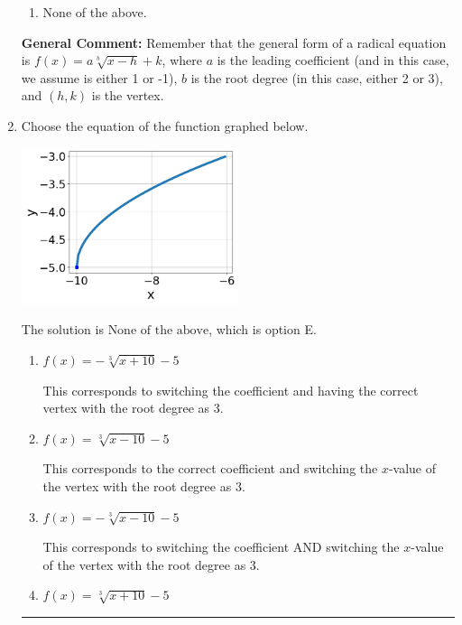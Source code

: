 \documentclass{extbook}[14pt]
\newcommand{\litem}[1]{\item #1

\rule{\textwidth}{0.4pt}}
\begin{document}
\begin{enumerate}
{\begin{enumerate}[label=\Alph*.]
\item None of the above.\end{enumerate}
\textbf{General Comment:} Remember that the general form of a radical equation is $ f(x) = a \sqrt[b]{x - h} + k $, where $a$ is the leading coefficient (and in this case, we assume is either 1 or -1), $b$ is the root degree (in this case, either 2 or 3), and $(h, k)$ is the vertex.
}
\litem{
Choose the equation of the function graphed below.

\begin{center}
    \includegraphics[width=0.5\textwidth]{../Figures/radicalGraphToEquationCopyB.png}
\end{center}


The solution is \( \text{None of the above} \), which is option E.\begin{enumerate}[label=\Alph*.]
\item \( f(x) = - \sqrt[3]{x + 10} - 5 \)

This corresponds to switching the coefficient and having the correct vertex with the root degree as $3$.
\item \( f(x) = \sqrt[3]{x - 10} - 5 \)

This corresponds to the correct coefficient and switching the $x$-value of the vertex with the root degree as $3$.
\item \( f(x) = - \sqrt[3]{x - 10} - 5 \)

This corresponds to switching the coefficient AND switching the $x$-value of the vertex with the root degree as $3$.
\item \( f(x) = \sqrt[3]{x + 10} - 5 \)


\end{enumerate}}
\end{enumerate}
\end{document}
